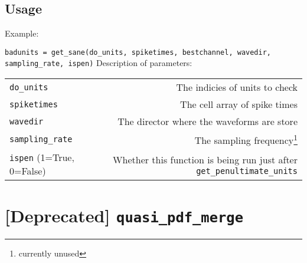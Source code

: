 \documentclass{article}
\begin{document}
\subsection{Usage}
Example: 

\texttt{badunits = get\_sane(do\_units, spiketimes, bestchannel, wavedir, sampling\_rate, ispen)}
Description of parameters:
\begin{center}
\begin{longtable}{l r}
\texttt{do\_units}&The indicies of units to check\\
\texttt{spiketimes}&The cell array of spike times\\
\texttt{wavedir}&The director where the waveforms are store\\
\texttt{sampling\_rate}&The sampling frequency\footnote{currently unused}\\
\texttt{ispen} (1=True, 0=False)&Whether this function is being run just after \texttt{get\_penultimate\_units}
\end{longtable}
\end{center}



\section{[Deprecated] \texttt{quasi\_pdf\_merge}}
\end{document}
